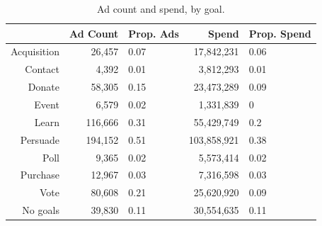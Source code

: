 \begin{table}[ht]
\centering
\begin{tabular}{rrlrl}
  \hline
 & Ad Count & Prop. Ads & Spend & Prop. Spend \\ 
  \hline
Acquisition & 26,457 & 0.07 & 17,842,231 & 0.06 \\ 
  Contact & 4,392 & 0.01 & 3,812,293 & 0.01 \\ 
  Donate & 58,305 & 0.15 & 23,473,289 & 0.09 \\ 
  Event & 6,579 & 0.02 & 1,331,839 & 0 \\ 
  Learn & 116,666 & 0.31 & 55,429,749 & 0.2 \\ 
  Persuade & 194,152 & 0.51 & 103,858,921 & 0.38 \\ 
  Poll & 9,365 & 0.02 & 5,573,414 & 0.02 \\ 
  Purchase & 12,967 & 0.03 & 7,316,598 & 0.03 \\ 
  Vote & 80,608 & 0.21 & 25,620,920 & 0.09 \\ 
  No goals & 39,830 & 0.11 & 30,554,635 & 0.11 \\ 
   \hline
\end{tabular}
\caption{Ad count and spend, by goal.} 
\label{tab:basic_stats}
\end{table}
